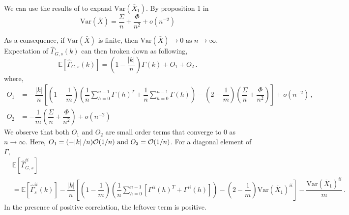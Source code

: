 \documentclass[11pt]{article}
\newcommand{\E}{\mathbb{E}}
\newcommand{\Var}{\text{Var}}
\theoremstyle{remark}
\begin{document}
 We can use the results of \cite{song1995optimal} to expand $\Var(\bar{X}_1)$. By proposition 1 in \cite{song1995optimal} 
\[
\Var(\bar{X}) = \dfrac{\Sigma}{n} + \dfrac{\Phi}{n^2} + o(n^{-2})
\]

As a consequence, if $\Var(\bar{X})$ is finite, then $\Var(\bar{X}) \to 0 \textrm{ as } n \to \infty$. Expectation of $\hat{\Gamma}_{G,s}(k)$ can then broken down as following,
 \begin{equation} \label{eq:G-ACF_expec_breakdown}
     \mathbb{E}\left[\hat{\Gamma}_{G,s}(k)\right] = \left(1- \dfrac{|k|}{n}\right)\Gamma(k) + O_1 + O_2\,.
 \end{equation}
%
where,
\begin{align*}
    O_1 &= -\dfrac{|k|}{n}\left[\left(1-\dfrac{1}{m}\right)\left(\dfrac{1}{n}\sum_{h=0}^{n-1}\Gamma(h)^T + \dfrac{1}{n}\sum_{h=0}^{n-1}\Gamma(h)\right) - \left(2-\dfrac{1}{m}\right) \left(\dfrac{\Sigma}{n} + \dfrac{\Phi}{n^2}\right)\right] + o(n^{-2})\, ,\\
    O_2 &= -\dfrac{1}{m}\left(\dfrac{\Sigma}{n} + \dfrac{\Phi}{n^2}\right) + o(n^{-2})
\end{align*}
%
We observe that both $O_1 \textrm{ and } O_2$ are small order terms that converge to 0 as $n \to \infty$. Here, $O_1 = (-\abs{k}/n)\mathcal{O}(1/n) \textrm{ and } O_2 = {\mathcal{O}}(1/n)$. For a diagonal element of $\Gamma$,
%
\begin{align*}
& \E \left[ \hat{\Gamma}_{G,s}^{ii}\right]\\
& = \mathbb{E}\left[\hat{\Gamma}^{ii}_{s}(k)\right] - \dfrac{|k|}{n}\left[\left(1-\dfrac{1}{m}\right)\left(\dfrac{1}{n}\sum_{h=0}^{n-1} \left[\Gamma^{ii}(h)^T + \Gamma^{ii}(h) \right] \right) - \left(2-\dfrac{1}{m}\right) \Var(\overline{X}_1)^{ii}\right] - \dfrac{\Var(\overline{X}_1)^{ii}}{m}\,.
\end{align*}
In the presence of positive correlation, the leftover term is positive.


\end{document}
